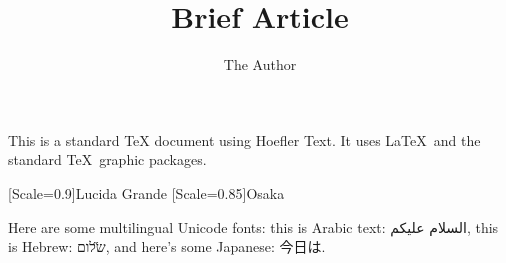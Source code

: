 \documentclass[12pt]{article}
\title{Brief Article}
\author{The Author}
\begin{document}
\maketitle

This is a standard TeX document using Hoefler Text. It uses \LaTeX\ and
the standard \TeX\ graphic packages.


\newfontfamily{\H}[Scale=0.9]{Lucida Grande}
\newfontfamily{\J}[Scale=0.85]{Osaka}

Here are some multilingual Unicode fonts: this is Arabic text: {\A السلام عليكم}, 
this is Hebrew: {\H שלום}, and here's some Japanese: {\J 今日は}.
\end{document}
